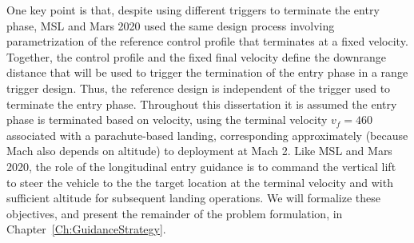 One key point is that, despite using different triggers to terminate the entry phase, MSL and Mars 2020 used the same design process involving parametrization of the reference control profile that terminates at a fixed velocity. Together, the control profile and the fixed final velocity define the downrange distance that will be used to trigger the termination of the entry phase in a range trigger design. Thus, the reference design is independent of the trigger used to terminate the entry phase. 
Throughout this dissertation it is assumed the entry phase is terminated based on velocity, using the terminal velocity $v_f=460$ associated with a parachute-based landing, corresponding approximately (because Mach also depends on altitude) to deployment at Mach 2. Like MSL and Mars 2020, the role of the longitudinal entry guidance is to command the vertical lift to steer the vehicle to the the target location at the terminal velocity and with sufficient altitude for subsequent landing operations. We will formalize these objectives, and present the remainder of the problem formulation, in Chapter~\ref{Ch:GuidanceStrategy}.


 

% 






